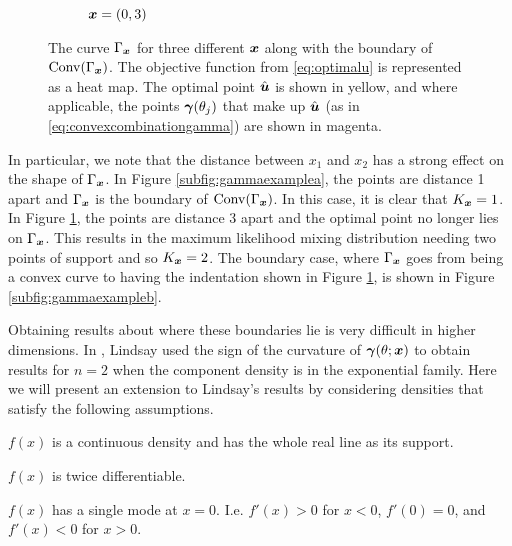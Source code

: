 \begin{figure}[ht]
\begin{subfigure}[t]{0.32\textwidth}
				\caption{${\bm{{x}}} = (0,3)$} \label{subfig:gammaexamplec}
			\end{subfigure}
			\caption{The curve $\Gamma_{\bm{{x}}}$ for three different ${\bm{{x}}}$ along with the boundary of $\mathrm{Conv}(\Gamma_{\bm{{x}}})$. The objective function from \eqref{eq:optimalu} is represented as a heat map. The optimal point $\hat{{\bm{{u}}}}$ is shown in yellow, and where applicable, the points ${\bm{{\gamma}}}(\theta_j)$ that make up $\hat{{\bm{{u}}}}$ (as in \eqref{eq:convexcombinationgamma}) are shown in magenta.}
			\label{fig:Gammaexample}
		\end{figure}
		In particular, we note that the distance between $x_1$ and $x_2$ has a strong effect on the shape of $\Gamma_{\bm{{x}}}$. In Figure \ref{subfig:gammaexamplea}, the points are distance 1 apart and $\Gamma_{\bm{{x}}}$ is the boundary of $\mathrm{Conv}(\Gamma_{\bm{{x}}})$. In this case, it is clear that $K_{\bm{{x}}} = 1$. In Figure \ref{subfig:gammaexamplec}, the points are distance 3 apart and the optimal point no longer lies on $\Gamma_{\bm{{x}}}$. This results in the maximum likelihood mixing distribution needing two points of support and so $K_{\bm{{x}}} = 2$. The boundary case, where $\Gamma_{\bm{{x}}}$ goes from being a convex curve to having the indentation shown in Figure \ref{subfig:gammaexamplec}, is shown in Figure \ref{subfig:gammaexampleb}.

		Obtaining results about where these boundaries lie is very difficult in higher dimensions. In \cite{Lindsay1983a-he}, Lindsay used the sign of the curvature of ${\bm{{\gamma}}}(\theta;{\bm{{x}}})$ to obtain results for $n=2$ when the component density is in the exponential family. Here we will present an extension to Lindsay's results by considering densities that satisfy the following assumptions.
	
		\begin{assumption}[Continuity]
			$f(x)$ is a continuous density and has the whole real line as its support.
			\label{assump:reallinesupport}
		\end{assumption}
		
		\begin{assumption}[Differentiability]
			$f(x)$ is twice differentiable.
			\label{assump:twicediff}
		\end{assumption}
		
		\begin{assumption}[Unimodality]
			$f(x)$ has a single mode at $x=0$. I.e. $f'(x) > 0$ for $x <0$, $f'(0) = 0$, and $f'(x) < 0$ for $x>0$.
			\label{assump:singlemode}
		\end{assumption}
		
